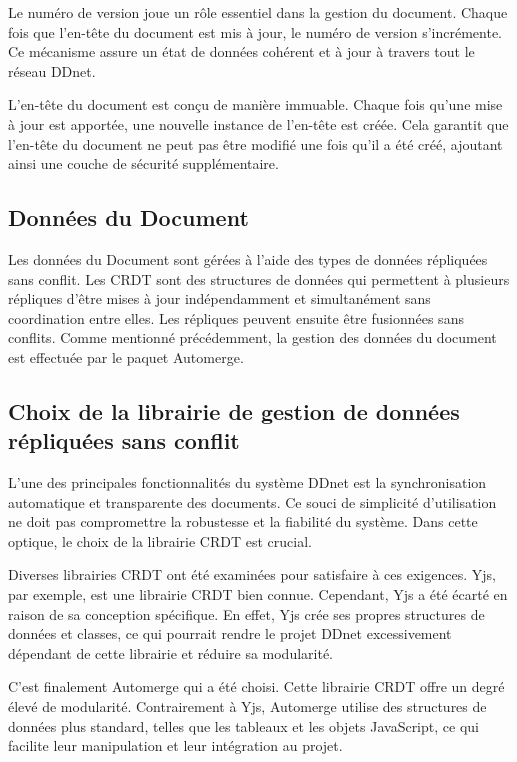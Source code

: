 Le numéro de version joue un rôle essentiel dans la gestion du document. Chaque fois que l'en-tête du document est mis à jour, le numéro de version s'incrémente. Ce mécanisme assure un état de données cohérent et à jour à travers tout le réseau \gls{DDnet}.

L'en-tête du document est conçu de manière immuable. Chaque fois qu'une mise à jour est apportée, une nouvelle instance de l'en-tête est créée. Cela garantit que l'en-tête du document ne peut pas être modifié une fois qu'il a été créé, ajoutant ainsi une couche de sécurité supplémentaire.

\subsection{Données du Document}

Les données du Document sont gérées à l'aide des types de données répliquées sans conflit. Les \gls{CRDT} sont des structures de données qui permettent à plusieurs répliques d'être mises à jour indépendamment et simultanément sans coordination entre elles. Les répliques peuvent ensuite être fusionnées sans conflits.
Comme mentionné précédemment, la gestion des données du document est effectuée par le paquet Automerge.

\subsection{Choix de la librairie de gestion de données répliquées sans conflit}

L'une des principales fonctionnalités du système \gls{DDnet} est la synchronisation automatique et transparente des documents. Ce souci de simplicité d'utilisation ne doit pas compromettre la robustesse et la fiabilité du système. Dans cette optique, le choix de la librairie \gls{CRDT} est crucial.

Diverses librairies \gls{CRDT} ont été examinées pour satisfaire à ces exigences. Yjs, par exemple, est une librairie \gls{CRDT} bien connue. Cependant, Yjs a été écarté en raison de sa conception spécifique. En effet, Yjs crée ses propres structures de données et classes, ce qui pourrait rendre le projet \gls{DDnet} excessivement dépendant de cette librairie et réduire sa modularité.

C'est finalement Automerge qui a été choisi. Cette librairie \gls{CRDT} offre un degré élevé de modularité. Contrairement à Yjs, Automerge utilise des structures de données plus standard, telles que les tableaux et les objets JavaScript, ce qui facilite leur manipulation et leur intégration au projet.

